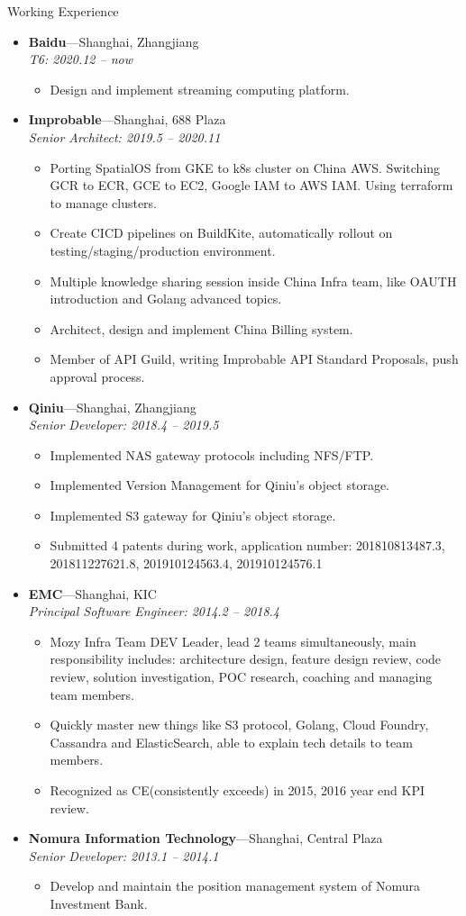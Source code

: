 \documentclass[11pt,oneside]{article}
\newenvironment{ressection}[1]{
	\vspace{4pt}
	{\selectfont\Large#1}
	\begin{itemize}
	\vspace{3pt}
}{
	\end{itemize}
}
\newcommand{\ressubitem}[1]{
	\vspace{-1pt}
	\item \begin{flushleft} #1 \end{flushleft}
}
\newcommand{\resbigitem}[3]{
	\vspace{-5pt}
	\item
	\textbf{#1}---#2 \\
	\textit{#3}
}
\newenvironment{ressubsec}[3]{
	\resbigitem{#1}{#2}{#3}
	\vspace{-2pt}
	\begin{itemize}
}{
    \end{itemize}
}
\begin{document}
\begin{ressection}{Working Experience}

	\begin{ressubsec}{Baidu}{Shanghai, Zhangjiang}{T6: 2020.12 -- now}
		\ressubitem{Design and implement streaming computing platform.}
	\end{ressubsec}

	\begin{ressubsec}{Improbable}{Shanghai, 688 Plaza}{Senior Architect: 2019.5 -- 2020.11}
		\ressubitem{Porting SpatialOS from GKE to k8s cluster on China AWS. Switching GCR to ECR, GCE to EC2, Google IAM to AWS IAM. Using terraform to manage clusters.}
		\ressubitem{Create CICD pipelines on BuildKite, automatically rollout on testing/staging/production environment.}
		\ressubitem{Multiple knowledge sharing session inside China Infra team, like OAUTH introduction and Golang advanced topics.}
		\ressubitem{Architect, design and implement China Billing system.}
		\ressubitem{Member of API Guild, writing Improbable API Standard Proposals, push approval process.}
	\end{ressubsec}

	\begin{ressubsec}{Qiniu}{Shanghai, Zhangjiang}{Senior Developer: 2018.4 -- 2019.5}
		\ressubitem{Implemented NAS gateway protocols including NFS/FTP.}
		\ressubitem{Implemented Version Management for Qiniu's object storage.}
		\ressubitem{Implemented S3 gateway for Qiniu's object storage.}
		\ressubitem{Submitted 4 patents during work, application number: 201810813487.3, 201811227621.8, 201910124563.4, 201910124576.1}
	\end{ressubsec}

	\begin{ressubsec}{EMC}{Shanghai, KIC}{Principal Software Engineer: 2014.2 -- 2018.4}
		\ressubitem{Mozy Infra Team DEV Leader, lead 2 teams simultaneously, main responsibility includes: architecture design, feature design review, code review, solution investigation, POC research, coaching and managing team members.}
		\ressubitem{Quickly master new things like S3 protocol, Golang, Cloud Foundry, Cassandra and ElasticSearch, able to explain tech details to team members.}
		\ressubitem{Recognized as CE(consistently exceeds) in 2015, 2016 year end KPI review.}
	\end{ressubsec}

	\begin{ressubsec}{Nomura Information Technology}{Shanghai, Central Plaza}{Senior Developer: 2013.1 -- 2014.1}
		\ressubitem{Develop and maintain the position management system of Nomura Investment Bank.}
	\end{ressubsec}


\end{ressection}
\end{document}
